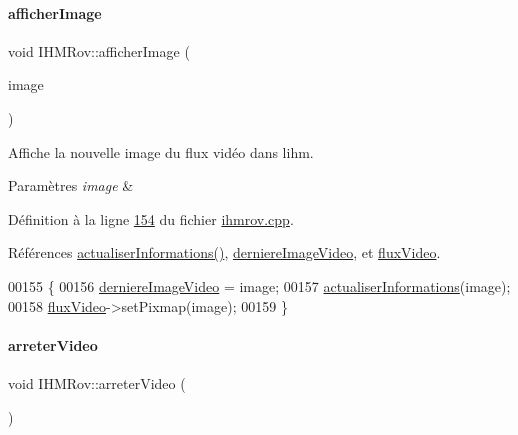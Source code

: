 \paragraph{\texorpdfstring{afficher\+Image}{afficherImage}}
{\footnotesize\ttfamily void I\+H\+M\+Rov\+::afficher\+Image (\begin{DoxyParamCaption}\item[{Q\+Pixmap}]{image }\end{DoxyParamCaption})\hspace{0.3cm}{\ttfamily [slot]}}



Affiche la nouvelle image du flux vidéo dans l\textquotesingle{}ihm. 


\begin{DoxyParams}{Paramètres}
{\em image} & \\
\hline
\end{DoxyParams}


Définition à la ligne \hyperlink{ihmrov_8cpp_source_l00154}{154} du fichier \hyperlink{ihmrov_8cpp_source}{ihmrov.\+cpp}.



Références \hyperlink{ihmrov_8cpp_source_l00110}{actualiser\+Informations()}, \hyperlink{ihmrov_8h_source_l00053}{derniere\+Image\+Video}, et \hyperlink{ihmrov_8h_source_l00050}{flux\+Video}.


\begin{DoxyCode}
00155 \{
00156     \hyperlink{class_i_h_m_rov_a2081e30323773ee895199ec026d82fc8}{derniereImageVideo} = image;
00157     \hyperlink{class_i_h_m_rov_a58ba3661c111c9ab2d6f1e3c52f4ec21}{actualiserInformations}(image);
00158     \hyperlink{class_i_h_m_rov_acdeabe02e1431b5c1817cb2a89debd0a}{fluxVideo}->setPixmap(image);
00159 \}
\end{DoxyCode}
\mbox{\label{class_i_h_m_rov_a81335964f1443d11e0929017b2f21267}} 
\paragraph{\texorpdfstring{arreter\+Video}{arreterVideo}}
{\footnotesize\ttfamily void I\+H\+M\+Rov\+::arreter\+Video (\begin{DoxyParamCaption}{ }\end{DoxyParamCaption})\hspace{0.3cm}{\ttfamily [slot]}}



